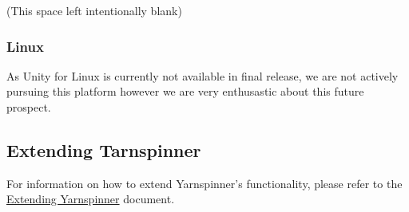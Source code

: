 (This space left intentionally blank)

\subsubsection*{Linux}

As Unity for Linux is currently not available in final release, we are not actively pursuing this platform however we are very enthusastic about this future prospect.

\subsection*{Extending Tarnspinner}

For information on how to extend Yarnspinner's functionality, please refer to the \hyperlink{a00176}{Extending Yarnspinner} document. 
